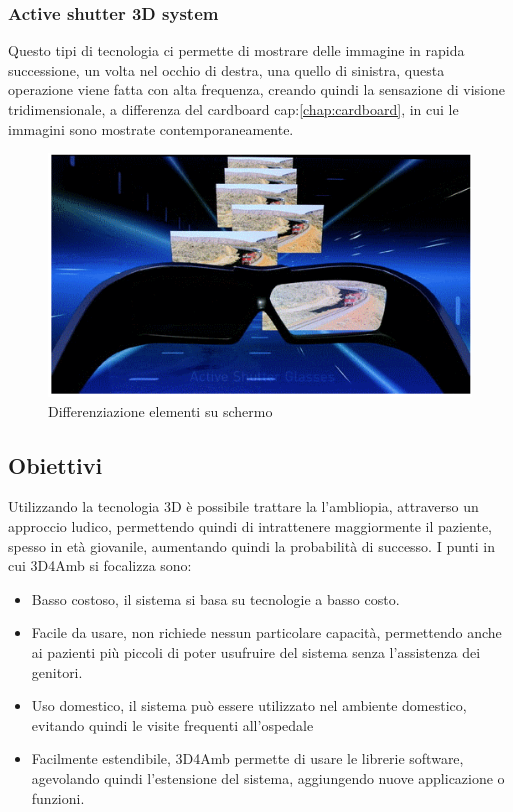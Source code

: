 \documentclass[10pt,a4paper]{article}
\begin{document}
	\subsubsection{Active shutter 3D system}
	Questo tipi di tecnologia ci permette di mostrare delle immagine in rapida successione, un volta nel occhio di destra, una quello di sinistra, questa operazione viene fatta con alta frequenza, creando quindi la sensazione di visione tridimensionale, a differenza del cardboard cap:\ref{chap:cardboard}, in cui le immagini sono mostrate contemporaneamente.
		\begin{figure}[H]
		\centering
		\includegraphics[width=0.7\linewidth]{image/active-shutter-3d-technology}
		\caption{Differenziazione elementi su schermo }
		\label{fig:occhiali active-shutter-3d-technology}
	\end{figure}

	\subsection{Obiettivi}
	Utilizzando la tecnologia 3D è possibile trattare la l'ambliopia, attraverso un approccio ludico, permettendo quindi di intrattenere maggiormente il paziente, spesso in età giovanile, aumentando quindi la probabilità di successo.
	I punti in cui 3D4Amb si focalizza sono:
	\begin{itemize}
		\item Basso costoso, il sistema si basa su tecnologie a basso costo.
		\item Facile da usare, non richiede nessun particolare capacità, permettendo anche ai pazienti più piccoli di poter usufruire del sistema senza l'assistenza dei genitori.
		\item Uso domestico, il sistema può essere utilizzato nel ambiente domestico, evitando quindi le visite frequenti all'ospedale
		\item Facilmente estendibile, 3D4Amb permette di usare le librerie software, agevolando  quindi l'estensione del sistema, aggiungendo nuove applicazione o funzioni.
	\end{itemize}
	\newpage
	\null
	\newpage
	
\end{document}
